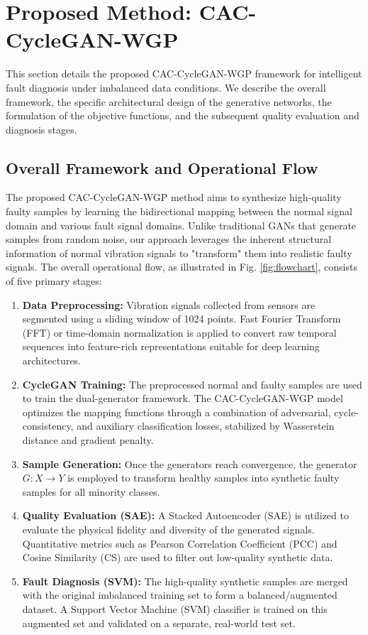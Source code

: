 \section{Proposed Method: CAC-CycleGAN-WGP}
\label{sec:proposed_method}

This section details the proposed CAC-CycleGAN-WGP framework for intelligent fault diagnosis under imbalanced data conditions. We describe the overall framework, the specific architectural design of the generative networks, the formulation of the objective functions, and the subsequent quality evaluation and diagnosis stages.

\subsection{Overall Framework and Operational Flow}
The proposed CAC-CycleGAN-WGP method aims to synthesize high-quality faulty samples by learning the bidirectional mapping between the normal signal domain and various fault signal domains. Unlike traditional GANs that generate samples from random noise, our approach leverages the inherent structural information of normal vibration signals to "transform" them into realistic faulty signals. The overall operational flow, as illustrated in Fig. \ref{fig:flowchart}, consists of five primary stages:

\begin{enumerate}
    \item \textbf{Data Preprocessing:} Vibration signals collected from sensors are segmented using a sliding window of 1024 points. Fast Fourier Transform (FFT) or time-domain normalization is applied to convert raw temporal sequences into feature-rich representations suitable for deep learning architectures.
    \item \textbf{CycleGAN Training:} The preprocessed normal and faulty samples are used to train the dual-generator framework. The CAC-CycleGAN-WGP model optimizes the mapping functions through a combination of adversarial, cycle-consistency, and auxiliary classification losses, stabilized by Wasserstein distance and gradient penalty.
    \item \textbf{Sample Generation:} Once the generators reach convergence, the generator $G: X \to Y$ is employed to transform healthy samples into synthetic faulty samples for all minority classes.
    \item \textbf{Quality Evaluation (SAE):} A Stacked Autoencoder (SAE) is utilized to evaluate the physical fidelity and diversity of the generated signals. Quantitative metrics such as Pearson Correlation Coefficient (PCC) and Cosine Similarity (CS) are used to filter out low-quality synthetic data.
    \item \textbf{Fault Diagnosis (SVM):} The high-quality synthetic samples are merged with the original imbalanced training set to form a balanced/augmented dataset. A Support Vector Machine (SVM) classifier is trained on this augmented set and validated on a separate, real-world test set.
\end{enumerate}

